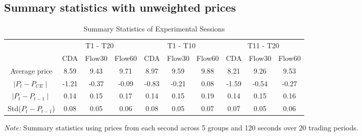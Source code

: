 \subsection{Summary statistics with unweighted prices}
\begin{table}[H]
    \centering
    \caption{Summary Statistics of Experimental Sessions}
    \begin{threeparttable}        
    \begin{tabular}{cccccccccc}
    \toprule
     & \multicolumn{3}{c}{T1 - T20} & \multicolumn{3}{c}{T1 - T10}  & \multicolumn{3}{c}{T11 - T20}  \\
     & CDA          & Flow30          & Flow60          & CDA           & Flow30          & Flow60          & CDA        & Flow30          & Flow60           \\
    \midrule
    Average price & 8.59 & 9.43 & 9.71 & 8.97 & 9.59 & 9.88 & 8.21 & 9.26 & 9.53 \\
    $\mid P_t - P_{CE} \mid$ & -1.21 & -0.37 & -0.09 & -0.83 & -0.21 & 0.08 & -1.59 & -0.54 & -0.27 \\
    $\mid P_{t} - P_{t - 1} \mid$ & 0.14 & 0.15 & 0.17 & 0.14 & 0.15 & 0.19 & 0.14 & 0.15 & 0.16 \\
    Std($P_{t} - P_{t - 1}$) & 0.08 & 0.05 & 0.06 & 0.08 & 0.05 & 0.07 & 0.07 & 0.05 & 0.06 \\
    \bottomrule
    \end{tabular}
    \begin{tablenotes}
    \item \small \textit{Note:} Summary statistics using prices from each second across 5 groups and 120 seconds over 20 trading periods. 
    \end{tablenotes}
    \end{threeparttable}
    \label{tab:summary_stat_raw}
\end{table}

